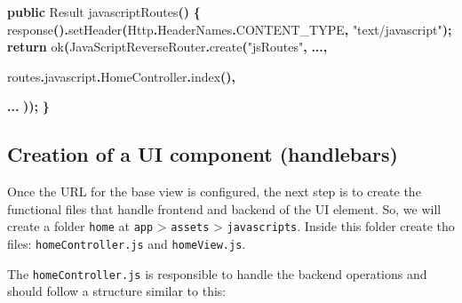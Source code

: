 \documentclass[
  11pt,
]{krantz}
\newenvironment{Shaded}{\begin{snugshade}}{\end{snugshade}}
\newcommand{\BuiltInTok}[1]{#1}
\newcommand{\ControlFlowTok}[1]{\textcolor[rgb]{0.27,0.27,0.27}{\textbf{#1}}}
\newcommand{\FunctionTok}[1]{\textcolor[rgb]{0,0,0}{#1}}
\newcommand{\KeywordTok}[1]{\textcolor[rgb]{0.27,0.27,0.27}{\textbf{#1}}}
\newcommand{\NormalTok}[1]{#1}
\newcommand{\OperatorTok}[1]{\textcolor[rgb]{0.43,0.43,0.43}{\textbf{#1}}}
\newcommand{\StringTok}[1]{\textcolor[rgb]{0.5,0.5,0.5}{#1}}
\begin{document}
\begin{Shaded}
\begin{Highlighting}[]
\KeywordTok{public} \BuiltInTok{Result} \FunctionTok{javascriptRoutes}\OperatorTok{()} \OperatorTok{\{}
    \FunctionTok{response}\OperatorTok{().}\FunctionTok{setHeader}\OperatorTok{(}\NormalTok{Http}\OperatorTok{.}\FunctionTok{HeaderNames}\OperatorTok{.}\FunctionTok{CONTENT\_TYPE}\OperatorTok{,} \StringTok{"text/javascript"}\OperatorTok{);}
    \ControlFlowTok{return} \FunctionTok{ok}\OperatorTok{(}\NormalTok{JavaScriptReverseRouter}\OperatorTok{.}\FunctionTok{create}\OperatorTok{(}\StringTok{"jsRoutes"}\OperatorTok{,}
        \KeywordTok{...}\OperatorTok{,}

\NormalTok{        routes}\OperatorTok{.}\FunctionTok{javascript}\OperatorTok{.}\FunctionTok{HomeController}\OperatorTok{.}\FunctionTok{index}\OperatorTok{(),}

        \KeywordTok{...}
    \OperatorTok{));}
\OperatorTok{\}}
\end{Highlighting}
\end{Shaded}

\hypertarget{creation-of-a-ui-component-handlebars}{%
\subsection{Creation of a UI component (handlebars)}\label{creation-of-a-ui-component-handlebars}}

Once the URL for the base view is configured, the next step is to create the functional files that handle frontend and backend of the UI element. So, we will create a folder \texttt{home} at \texttt{app} \textgreater{} \texttt{assets} \textgreater{} \texttt{javascripts}. Inside this folder create tho files: \texttt{homeController.js} and \texttt{homeView.js}.

The \texttt{homeController.js} is responsible to handle the backend operations and should follow a structure similar to this:
\end{document}
